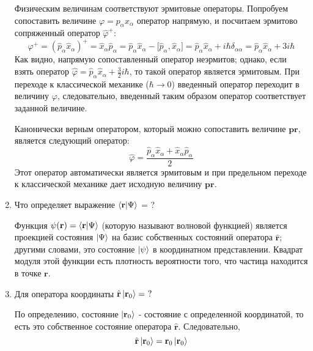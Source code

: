 \documentclass{article}
\begin{document}
\begin{enumerate}
	Физическим величинам соответствуют эрмитовые операторы. Попробуем сопоставить величине $\varphi = p_\alpha x_\alpha$ оператор напрямую, и посчитаем эрмитово сопряженный оператор $\hat{\varphi}^+$:
	\begin{equation}
		\varphi^+ = (\hat{p}_\alpha \hat{x}_\alpha)^+ = \hat{x}_\alpha \hat{p}_\alpha = \hat{p}_\alpha \hat{x}_\alpha - \big[\hat{p}_\alpha, \hat{x}_\alpha \big] = \hat{p}_\alpha \hat{x}_\alpha + i\hbar \delta_{\alpha\alpha} = \hat{p}_\alpha \hat{x}_\alpha + 3i\hbar
	\end{equation}
	Как видно, напрямую сопоставленный оператор неэрмитов; однако, если взять оператор $\hat{\varphi} = \hat{p}_\alpha \hat{x}_\alpha + \frac{3}{2}i\hbar$, то такой оператор является эрмитовым. При переходе к классической механике ($\hbar \to 0$) введенный оператор переходит в величину $\varphi$, следовательно, введенный таким образом оператор соответствует заданной величине.
	
	Канонически верным оператором, который можно сопоставить величине $\textbf{pr}$, является следующий оператор:
	\begin{equation}
		\hat{\varphi} = \frac{\hat{p}_\alpha \hat{x}_\alpha + \hat{x}_\alpha \hat{p}_\alpha}{2}
	\end{equation}
	Этот оператор автоматически является эрмитовым и при предельном переходе к классической механике дает исходную величину $\textbf{pr}$.
	
	\item {Что определяет выражение }$\braket{\textbf{r}|\Psi}${ = ?}
	
	Функция $\psi(\textbf{r}) = \braket{\textbf{r}|\Psi}$ (которую называют {волновой функцией}) является проекцией состояния $\ket{\Psi}$ на базис собственных состояний оператора $\hat{\textbf{r}}$; другими словами, это состояние $\ket{\psi}$ в координатном представлении. Квадрат модуля этой функции есть плотность вероятности того, что частица находится в точке $\textbf{r}$.
	
	\item {Для оператора координаты $\hat{\textbf{r} } \ket{\textbf{r}_0} = \ ?$}
	
	По определению, состояние $\ket{\textbf{r}_0}$ - состояние с определенной координатой, то есть это собственное состояние оператора $\hat{\textbf{r}}$. Следовательно,
	\begin{equation}
		\hat{\textbf{r}}\ket{\textbf{r}_0} = \textbf{r}_0 \ket{\textbf{r}_0}
	\end{equation}
	

\end{enumerate}
\end{document}
